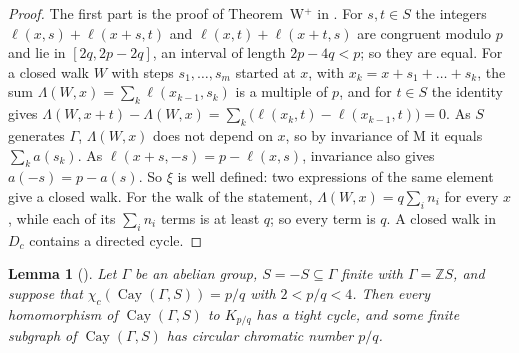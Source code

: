 \documentclass[11pt,a4paper]{amsart}
\newtheorem{lemma}{Lemma}
\theoremstyle{remark}
\newcommand{\Z}{\mathbb{Z}}
\newcommand{\Cay}{\operatorname{Cay}}
\begin{document}
\begin{proof}
The first part is the proof of Theorem~W$^+$ in \cite{Winding}. For $s,t\in S$ the integers
$\ell(x,s)+\ell(x+s,t)$ and $\ell(x,t)+\ell(x+t,s)$ are congruent modulo $p$ and lie in $[2q,2p-2q]$, an interval of
length $2p-4q<p$; so they are equal. For a closed walk $W$ with steps $s_1,\dots,s_m$ started at $x$, with
$x_k=x+s_1+\dots+s_k$, the sum $\Lambda(W,x)=\sum_k\ell(x_{k-1},s_k)$ is a multiple of $p$, and for $t\in S$ the
identity gives $\Lambda(W,x+t)-\Lambda(W,x)=\sum_k\bigl(\ell(x_k,t)-\ell(x_{k-1},t)\bigr)=0$. As $S$ generates
$\Gamma$, $\Lambda(W,x)$ does not depend on $x$, so by invariance of $\mathrm M$ it equals $\sum_ka(s_k)$. As
$\ell(x+s,-s)=p-\ell(x,s)$, invariance also gives $a(-s)=p-a(s)$. So $\xi$ is well defined: two expressions of the
same element give a closed walk. For the walk of the statement, $\Lambda(W,x)=q\sum_in_i$ for every $x$, while each
of its $\sum_in_i$ terms is at least $q$; so every term is $q$. A closed walk in $D_c$ contains a directed cycle.
\end{proof}

\begin{lemma}[{\cite[Corollary~16]{Winding}}]\label{lem:finiteS}
Let $\Gamma$ be an abelian group, $S=-S\subseteq\Gamma$ finite with $\Gamma=\Z S$, and suppose that
$\chi_c(\Cay(\Gamma,S))=p/q$ with $2<p/q<4$. Then every homomorphism of $\Cay(\Gamma,S)$ to $K_{p/q}$ has a tight
cycle, and some finite subgraph of $\Cay(\Gamma,S)$ has circular chromatic number $p/q$.
\end{lemma}
\end{document}
